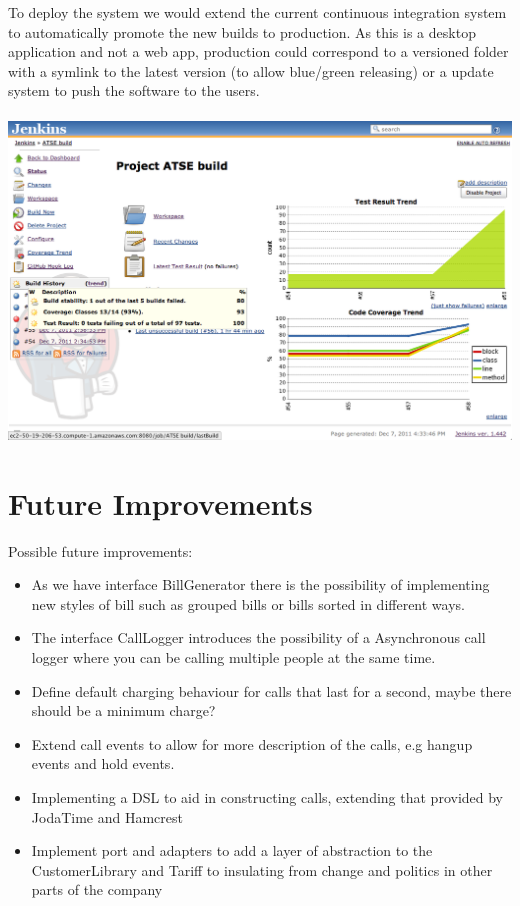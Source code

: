 \documentclass[a4paper,11pt]{article}
\begin{document}
To deploy the system we would extend the current continuous integration system to automatically promote the new builds to production. As this is a desktop application and not a web app, production could correspond to a versioned folder with a symlink to the latest version (to allow blue/green releasing) or a update system to push the software to the users.
\\\\

\includegraphics[scale=0.4]{images/jenkins_project.png}

\pagebreak

\section{Future Improvements}

Possible future improvements:
\begin{itemize}
\item As we have interface BillGenerator there is the possibility of implementing new styles of bill such as grouped bills or bills sorted in different ways. 
\item The interface CallLogger introduces the possibility of a Asynchronous call logger where you can be calling multiple people at the same time.
\item Define default charging behaviour for calls that last for a second, maybe there should be a minimum charge?
\item Extend call events to allow for more description of the calls, e.g hangup events and hold events.
\item Implementing a DSL to aid in constructing calls, extending that provided by JodaTime and Hamcrest
\item Implement port and adapters to add a layer of abstraction to the CustomerLibrary and Tariff to insulating from change and politics in other parts of the company
\end{itemize}
\end{document}
